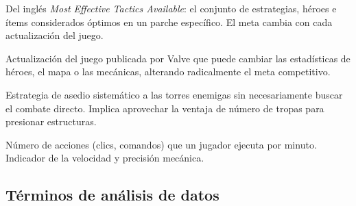 \documentclass[12pt,a4paper]{article}
\begin{document}
\begin{description}[leftmargin=3.8cm, style=nextline, itemsep=5pt]
  \item[Meta] Del ingl\'es \textit{Most Effective Tactics Available}: el conjunto
    de estrategias, h\'eroes e \'items considerados \'optimos en un parche
    espec\'ifico. El meta cambia con cada actualizaci\'on del juego.

  \item[Parche (Patch)] Actualizaci\'on del juego publicada por Valve que puede
    cambiar las estad\'isticas de h\'eroes, el mapa o las mec\'anicas, alterando
    radicalmente el meta competitivo.

  \item[Siegeo / Siege] Estrategia de asedio sistem\'atico a las torres enemigas
    sin necesariamente buscar el combate directo. Implica aprovechar la
    ventaja de n\'umero de tropas para presionar estructuras.

  \item[APM (Actions Per Minute)] N\'umero de acciones (clics, comandos) que un
    jugador ejecuta por minuto. Indicador de la velocidad y precisi\'on mec\'anica.

\end{description}

\subsection*{T\'erminos de an\'alisis de datos}
\end{document}
